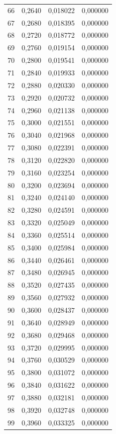 \begin{tabular}{lrrr}
66 & 0,2640 & 0,018022 & 0,000000 \\
67 & 0,2680 & 0,018395 & 0,000000 \\
68 & 0,2720 & 0,018772 & 0,000000 \\
69 & 0,2760 & 0,019154 & 0,000000 \\
70 & 0,2800 & 0,019541 & 0,000000 \\
71 & 0,2840 & 0,019933 & 0,000000 \\
72 & 0,2880 & 0,020330 & 0,000000 \\
73 & 0,2920 & 0,020732 & 0,000000 \\
74 & 0,2960 & 0,021138 & 0,000000 \\
75 & 0,3000 & 0,021551 & 0,000000 \\
76 & 0,3040 & 0,021968 & 0,000000 \\
77 & 0,3080 & 0,022391 & 0,000000 \\
78 & 0,3120 & 0,022820 & 0,000000 \\
79 & 0,3160 & 0,023254 & 0,000000 \\
80 & 0,3200 & 0,023694 & 0,000000 \\
81 & 0,3240 & 0,024140 & 0,000000 \\
82 & 0,3280 & 0,024591 & 0,000000 \\
83 & 0,3320 & 0,025049 & 0,000000 \\
84 & 0,3360 & 0,025514 & 0,000000 \\
85 & 0,3400 & 0,025984 & 0,000000 \\
86 & 0,3440 & 0,026461 & 0,000000 \\
87 & 0,3480 & 0,026945 & 0,000000 \\
88 & 0,3520 & 0,027435 & 0,000000 \\
89 & 0,3560 & 0,027932 & 0,000000 \\
90 & 0,3600 & 0,028437 & 0,000000 \\
91 & 0,3640 & 0,028949 & 0,000000 \\
92 & 0,3680 & 0,029468 & 0,000000 \\
93 & 0,3720 & 0,029995 & 0,000000 \\
94 & 0,3760 & 0,030529 & 0,000000 \\
95 & 0,3800 & 0,031072 & 0,000000 \\
96 & 0,3840 & 0,031622 & 0,000000 \\
97 & 0,3880 & 0,032181 & 0,000000 \\
98 & 0,3920 & 0,032748 & 0,000000 \\
99 & 0,3960 & 0,033325 & 0,000000 \\

\end{tabular}
